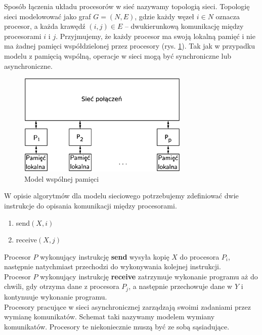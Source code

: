Sposób łączenia układu procesorów w sieć nazywamy topologią sieci. Topologię sieci modelowować jako graf \(G=(N,E)\), gdzie każdy węzeł \(i\in N\) oznacza procesor, a każda krawędź \((i, j) \in E\) – dwukierunkową komunikację między procesorami \(i\) i \(j\). Przyjmujemy, że każdy procesor ma swoją lokalną pamięć i nie ma żadnej pamięci współdzielonej przez procesory (rys. \ref{fig:model_net}). Tak jak w przypadku modelu z pamięcią wspólną, operacje w sieci mogą być synchroniczne lub asynchroniczne.\\

\begin{figure}[b]
\centering
\includegraphics[width=22em]{images/Rys_net.eps}
\caption{Model wspólnej pamięci}
\label{fig:model_net}
\end{figure}

W opisie algorytmów dla modelu sieciowego potrzebujemy zdefiniować dwie instrukcje do opisania komunikacji między procesorami.
\begin{enumerate}
 \item send\((X,i)\)
 \item receive\((X,j)\)
\end{enumerate}

Procesor \(P\) wykonujący instrukcję \textbf{send} wysyła kopię \(X\) do procesora \(P_i\), następnie natychmiast przechodzi do wykonywania kolejnej instrukcji.\\
Procesor \(P\) wykonujący instrukcję \textbf{receive} zatrzymuje wykonanie programu aż do chwili, gdy otrzyma dane z procesora \(P_j\), a następnie przechowuje dane w \(Y\) i kontynuuje wykonanie programu.\\


Procesory pracujące w sieci asynchronicznej zarządzają swoimi zadaniami przez wymianę komunikatów. Schemat taki nazywamy modelem wymiany komunikatów. Procesory te niekoniecznie muszą być ze sobą sąsiadujące. 


